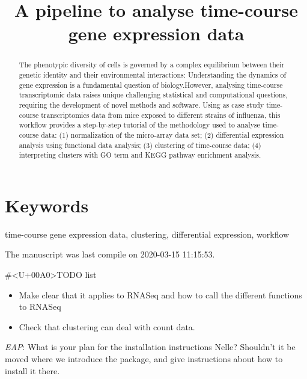 \documentclass[9pt,a4paper,]{extarticle}
\begin{document}
\pagestyle{front}

\title{A pipeline to analyse time-course gene expression data}


\maketitle
\thispagestyle{front}

\begin{abstract}
The phenotypic diversity of cells is governed by a complex equilibrium between their genetic identity and their environmental interactions: Understanding the dynamics of gene expression is a fundamental question of biology.However, analysing time-course transcriptomic data raises unique challenging statistical and computational questions, requiring the development of novel methods and software. Using as case study time-course transcriptomics data from mice exposed to different strains of influenza, this workflow provides a step-by-step tutorial of the methodology used to analyse time-course data: (1) normalization of the micro-array data set; (2) differential expression analysis using functional data analysis; (3) clustering of time-course data; (4) interpreting clusters with GO term and KEGG pathway enrichment analysis.
\end{abstract}

\section*{Keywords}
time-course gene expression data, clustering, differential expression, workflow


\clearpage
\pagestyle{main}

The manuscript was last compile on 2020-03-15 11:15:53.

\#\textless{}U+00A0\textgreater{}TODO list

\begin{itemize}
\tightlist
\item
  Make clear that it applies to RNASeq and how to call the different functions
  to RNASeq
\item
  Check that clustering can deal with count data.
\end{itemize}

\emph{EAP}: What is your plan for the installation instructions Nelle? Shouldn't it be moved where we introduce the package, and give instructions about how to install it there.
\end{document}
